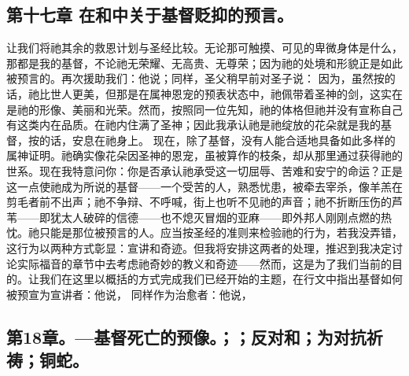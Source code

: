
\subsection{第十七章 在和中关于基督贬抑的预言。}

让我们将祂其余的救恩计划与圣经比较。无论那可触摸、可见的卑微身体是什么，那都是我的基督，不论祂无荣耀、无高贵、无尊荣；因为祂的处境和形貌正是如此被预言的。再次援助我们：他说；同样，圣父稍早前对圣子说： 因为，虽然按的话，祂比世人更美，但那是在属神恩宠的预表状态中，祂佩带着圣神的剑，这实在是祂的形像、美丽和光荣。然而，按照同一位先知，祂的体格但祂并没有宣称自己有这类内在品质。在祂内住满了圣神；因此我承认祂是祂绽放的花朵就是我的基督，按的话，安息在祂身上。 现在，除了基督，没有人能合适地具备如此多样的属神证明。祂确实像花朵因圣神的恩宠，虽被算作的枝条，却从那里通过获得祂的世系。现在我特意问你：你是否承认祂承受这一切屈辱、苦难和安宁的命运？正是这一点使祂成为所说的基督——一个受苦的人，熟悉忧患，被牵去宰杀，像羊羔在剪毛者前不出声；祂不争辩、不呼喊，街上也听不见祂的声音；祂不折断压伤的芦苇——即犹太人破碎的信德——也不熄灭冒烟的亚麻——即外邦人刚刚点燃的热忱。祂只能是那位被预言的人。应当按圣经的准则来检验祂的行为，若我没弄错，这行为以两种方式彰显：宣讲和奇迹。但我将安排这两者的处理，推迟到我决定讨论实际福音的章节中去考虑祂奇妙的教义和奇迹——然而，这是为了我们当前的目的。让我们在这里以概括的方式完成我们已经开始的主题，在行文中指出基督如何被预宣为宣讲者：他说， 同样作为治愈者：他说，\par


\subsection{第18章。—基督死亡的预像。；；反对和；为对抗祈祷；铜蛇。}

